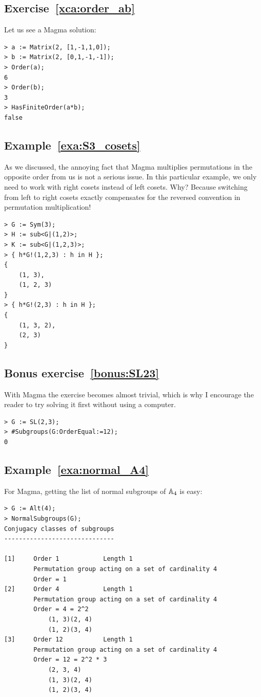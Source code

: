 \subsection*{Exercise~\ref{xca:order_ab}}

Let us see a Magma solution: 
\begin{lstlisting}
> a := Matrix(2, [1,-1,1,0]);
> b := Matrix(2, [0,1,-1,-1]);
> Order(a);
6
> Order(b);
3
> HasFiniteOrder(a*b);
false    
\end{lstlisting}

\subsection*{Example~\ref{exa:S3_cosets}}

As we discussed, the annoying fact that Magma multiplies permutations in the opposite order from us is not a serious issue. In this particular example, we only need to work with right cosets instead of left cosets.
Why? Because switching from left to right cosets exactly compensates for the reversed convention in permutation multiplication!

\begin{lstlisting}
> G := Sym(3);
> H := sub<G|(1,2)>;
> K := sub<G|(1,2,3)>;
> { h*G!(1,2,3) : h in H };
{
    (1, 3),
    (1, 2, 3)
}
> { h*G!(2,3) : h in H };
{
    (1, 3, 2),
    (2, 3)
}
\end{lstlisting}

\subsection*{Bonus exercise~\ref{bonus:SL23}}

With Magma the exercise becomes almost trivial, which is why I encourage the reader to try solving it first without using a computer.
\begin{lstlisting}
> G := SL(2,3);
> #Subgroups(G:OrderEqual:=12);
0    
\end{lstlisting}

\subsection*{Example~\ref{exa:normal_A4}}

For Magma, getting the list of normal subgroups of $\mathbb{A}_4$ 
is easy: 
\begin{lstlisting}
> G := Alt(4);
> NormalSubgroups(G);
Conjugacy classes of subgroups
------------------------------

[1]     Order 1            Length 1
        Permutation group acting on a set of cardinality 4
        Order = 1
[2]     Order 4            Length 1
        Permutation group acting on a set of cardinality 4
        Order = 4 = 2^2
            (1, 3)(2, 4)
            (1, 2)(3, 4)
[3]     Order 12           Length 1
        Permutation group acting on a set of cardinality 4
        Order = 12 = 2^2 * 3
            (2, 3, 4)
            (1, 3)(2, 4)
            (1, 2)(3, 4)    
\end{lstlisting}


